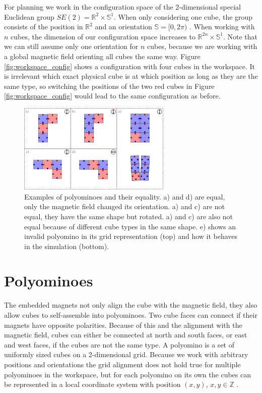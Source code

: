 For planning we work in the configuration space of the 2-dimensional special Euclidean group $SE(2) = \mathbb{R}^2 \times \mathbb{S}^1$.
When only considering one cube, the group consists of the position in $\mathbb{R}^2$ and an orientation $\mathbb{S} = [0,2\pi)$ \cite{LaValle2006}.
When working with $n$ cubes, the dimension of our configuration space increases to $\mathbb{R}^{2n} \times \mathbb{S}^1$.
Note that we can still assume only one orientation for $n$ cubes, because we are working with a global magnetic field orienting all cubes the same way.
Figure \ref{fig:workspace_config} shows a configuration with four cubes in the workspace.
It is irrelevant which exact physical cube is at which position as long as they are the same type, so switching the positions of the two red cubes in Figure \ref{fig:workspace_config} would lead to the same configuration as before.

\begin{figure}
	\centering
	\includegraphics[width=0.65\textwidth]{figures/polyominoes.pdf}
	\caption{Examples of polyominoes and their equality. a) and d) are equal, only the magnetic field changed its orientation. a) and c) are not equal, they have the same shape but rotated. a) and c) are also not equal because of different cube types in the same shape. e) shows an invalid polyomino in its grid representation (top) and how it behaves in the simulation (bottom).}
	\label{fig:polyominoes}
\end{figure}

\section{Polyominoes}
The embedded magnets not only align the cube with the magnetic field, they also allow cubes to self-assemble into polyominoes.
Two cube faces can connect if their magnets have opposite polarities.
Because of this and the alignment with the magnetic field, cubes can either be connected at north and south faces, or east and west faces, if the cubes are not the same type.
A polyomino is a set of uniformly sized cubes on a 2-dimensional grid.
Because we work with arbitrary positions and orientations the grid alignment does not hold true for multiple polyominoes in the workspace, but for each polyomino on its own the cubes can be represented in a local coordinate system with position $(x,y)$, $x,y \in \mathbb{Z}$ \cite{Lu2021}.

